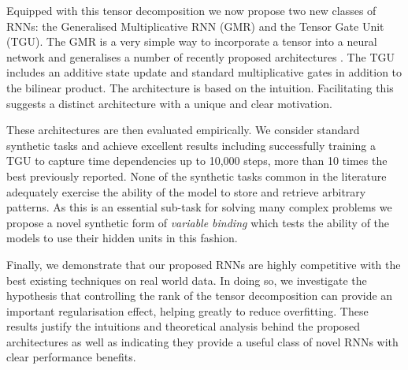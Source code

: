 Equipped with this tensor decomposition we now propose two new classes of RNNs: the Generalised
Multiplicative RNN (GMR) and the Tensor Gate Unit (TGU).
The GMR is a very simple way to incorporate a tensor into a neural network and generalises a number of
recently proposed architectures \autocite{Martens2011a, Wu2016}. The TGU includes an
additive state update and standard multiplicative gates in addition to the bilinear product. 
The architecture is based on the intuition. Facilitating this suggests a distinct architecture
with a unique and clear motivation.

These architectures are then evaluated empirically. We consider standard synthetic tasks and achieve
excellent results including successfully training a TGU to capture time dependencies up to 10,000 steps,
more than 10 times the best previously reported. None of the synthetic tasks common in the
literature adequately exercise the ability of the model to store and retrieve arbitrary patterns.
As this is an essential sub-task for solving many complex problems we propose a novel synthetic
form of \emph{variable binding} which tests the ability of the models to use their hidden units in this
fashion.

Finally, we demonstrate that our proposed RNNs are highly competitive with the best existing techniques
on real world data. In doing so, we investigate the hypothesis that controlling the rank of the tensor
decomposition can provide an important regularisation effect, helping greatly to reduce overfitting.
These results justify the intuitions and theoretical analysis behind the proposed architectures
as well as indicating they provide a useful class of novel RNNs with clear performance benefits.